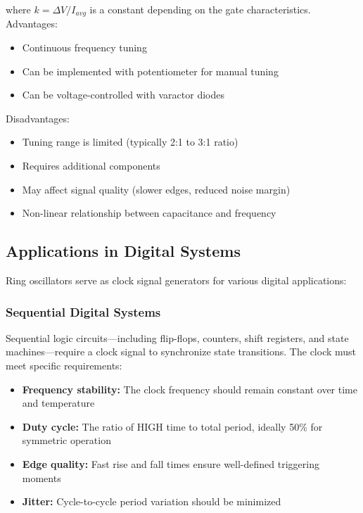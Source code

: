 \documentclass[10pt]{article}
\begin{document}
where $k = \Delta V / I_{avg}$ is a constant depending on the gate characteristics. \\

Advantages:
\begin{itemize}
    \item Continuous frequency tuning
    \item Can be implemented with potentiometer for manual tuning
    \item Can be voltage-controlled with varactor diodes
\end{itemize}

Disadvantages: 
\begin{itemize}
    \item Tuning range is limited (typically 2:1 to 3:1 ratio)
    \item Requires additional components
    \item May affect signal quality (slower edges, reduced noise margin)
    \item Non-linear relationship between capacitance and frequency
\end{itemize}


\subsection{Applications in Digital Systems}

Ring oscillators serve as clock signal generators for various digital applications:

\subsubsection{Sequential Digital Systems}

Sequential logic circuits—including flip-flops, counters, shift registers, and state machines—require a clock signal to synchronize state transitions. The clock must meet specific requirements:

\begin{itemize}
    \item \textbf{Frequency stability: } The clock frequency should remain constant over time and temperature
    \item \textbf{Duty cycle:} The ratio of HIGH time to total period, ideally 50\% for symmetric operation
    \item \textbf{Edge quality:} Fast rise and fall times ensure well-defined triggering moments
    \item \textbf{Jitter:} Cycle-to-cycle period variation should be minimized
\end{itemize}
\end{document}
